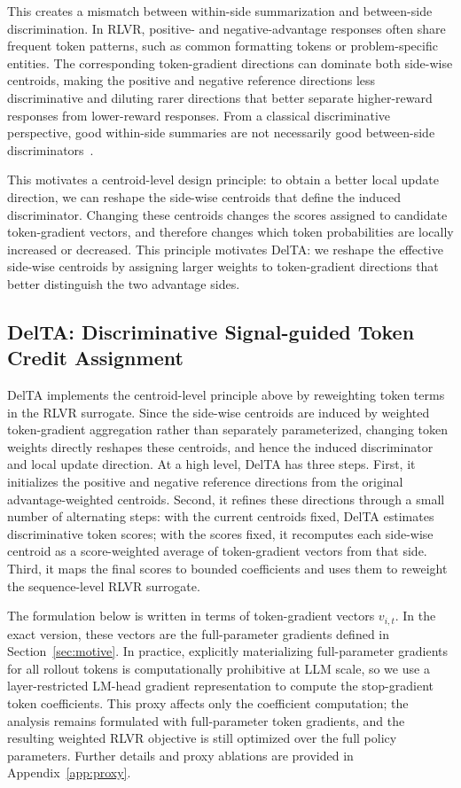 \documentclass{article} %
\begin{document}
This creates a mismatch between within-side summarization and between-side discrimination. 
In RLVR, positive- and negative-advantage responses often share frequent token patterns, such as common formatting tokens or problem-specific entities. 
The corresponding token-gradient directions can dominate both side-wise centroids, making the positive and negative reference directions less discriminative and diluting rarer directions that better separate higher-reward responses from lower-reward responses. 
From a classical discriminative perspective, good within-side summaries are not necessarily good between-side discriminators~\citep{cohen2013applied,zhao2024linear,khosla2020supervised}.

This motivates a centroid-level design principle: to obtain a better local update direction, we can reshape the side-wise centroids that define the induced discriminator. 
Changing these centroids changes the scores assigned to candidate token-gradient vectors, and therefore changes which token probabilities are locally increased or decreased. 
This principle motivates DelTA: we reshape the effective side-wise centroids by assigning larger weights to token-gradient directions that better distinguish the two advantage sides.

\subsection{DelTA: Discriminative Signal-guided Token Credit Assignment}
\label{sec:DelTA}

DelTA implements the centroid-level principle above by reweighting token terms in the RLVR surrogate. 
Since the side-wise centroids are induced by weighted token-gradient aggregation rather than separately parameterized, changing token weights directly reshapes these centroids, and hence the induced discriminator and local update direction. 
At a high level, DelTA has three steps. 
First, it initializes the positive and negative reference directions from the original advantage-weighted centroids. 
Second, it refines these directions through a small number of alternating steps: with the current centroids fixed, DelTA estimates discriminative token scores; with the scores fixed, it recomputes each side-wise centroid as a score-weighted average of token-gradient vectors from that side. 
Third, it maps the final scores to bounded coefficients and uses them to reweight the sequence-level RLVR surrogate.

The formulation below is written in terms of token-gradient vectors \(v_{i,t}\). 
In the exact version, these vectors are the full-parameter gradients defined in Section~\ref{sec:motive}. 
In practice, explicitly materializing full-parameter gradients for all rollout tokens is computationally prohibitive at LLM scale, so we use a layer-restricted LM-head gradient representation to compute the stop-gradient token coefficients. 
This proxy affects only the coefficient computation; the analysis remains formulated with full-parameter token gradients, and the resulting weighted RLVR objective is still optimized over the full policy parameters. 
Further details and proxy ablations are provided in Appendix~\ref{app:proxy}.
\end{document}
